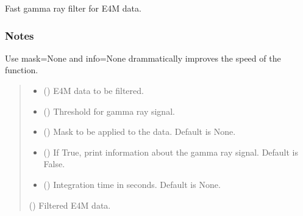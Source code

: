 \documentclass[letterpaper,10pt,english]{sphinxmanual}
\begin{document}

\begin{fulllineitems}
\label{\detokenize{index:COSMICRAY_tools.fast_gamma_filter}}
\pysigstartsignatures
\pysiglinewithargsret
{}
{\sphinxparamcomma {}\sphinxparamcomma {}\sphinxparamcomma {}\sphinxparamcomma {}}
{}
\pysigstopsignatures
\sphinxAtStartPar
Fast gamma ray filter for E4M data.
\subsubsection*{Notes}

\sphinxAtStartPar
Use mask=None and info=None drammatically improves the speed of the function.
\begin{quote}\begin{description}
\begin{itemize}
\item {} 
\sphinxAtStartPar
{} () \textendash{} E4M data to be filtered.

\item {} 
\sphinxAtStartPar
{} () \textendash{} Threshold for gamma ray signal.

\item {} 
\sphinxAtStartPar
{} () \textendash{} Mask to be applied to the data. Default is None.

\item {} 
\sphinxAtStartPar
{} () \textendash{} If True, print information about the gamma ray signal. Default is False.

\item {} 
\sphinxAtStartPar
{} () \textendash{} Integration time in seconds. Default is None.

\end{itemize}

\sphinxAtStartPar
{} () \textendash{} Filtered E4M data.

\end{description}\end{quote}

\end{fulllineitems}
\end{document}
